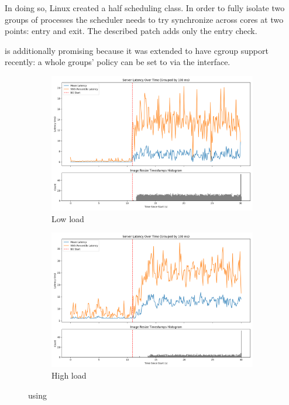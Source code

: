 In doing so, Linux created a half scheduling class. In order to fully isolate
two groups of processes the scheduler needs to try synchronize across cores at
two points: entry and exit. The described patch adds only the entry check.

\schedidle{} is additionally promising because it was extended to have cgroup
support recently\cite{TODO}: a whole groups' policy can be set to \schedidle{}
via the \cgroups{} interface.

\begin{figure}[t]
    \centering
    \begin{subfigure}[t]{0.49\columnwidth}
        \includegraphics[width=\columnwidth]{graphs/unedited-idle-low-two.png}
        \caption{Low load}\label{fig:unedited-idle-low-two}
    \end{subfigure}
    \hspace{\fill}
    \begin{subfigure}[t]{0.49\columnwidth}
        \includegraphics[width=\columnwidth]{graphs/unedited-idle-high-two.png}
        \caption{High load}\label{fig:unedited-idle-high-two}
    \end{subfigure}
    \vspace{4pt}
    \caption{using \schedidle{}}\label{fig:unedited-idle}
\end{figure}

